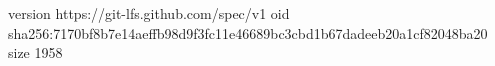 version https://git-lfs.github.com/spec/v1
oid sha256:7170bf8b7e14aeffb98d9f3fc11e46689bc3cbd1b67dadeeb20a1cf82048ba20
size 1958
